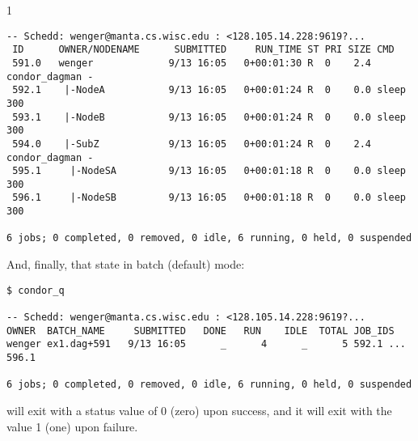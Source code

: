 \begin{ManPage}{\label{man-condor-q}}{1}
\begin{verbatim}
-- Schedd: wenger@manta.cs.wisc.edu : <128.105.14.228:9619?...
 ID      OWNER/NODENAME      SUBMITTED     RUN_TIME ST PRI SIZE CMD
 591.0   wenger             9/13 16:05   0+00:01:30 R  0    2.4 condor_dagman -
 592.1    |-NodeA           9/13 16:05   0+00:01:24 R  0    0.0 sleep 300
 593.1    |-NodeB           9/13 16:05   0+00:01:24 R  0    0.0 sleep 300
 594.0    |-SubZ            9/13 16:05   0+00:01:24 R  0    2.4 condor_dagman -
 595.1     |-NodeSA         9/13 16:05   0+00:01:18 R  0    0.0 sleep 300
 596.1     |-NodeSB         9/13 16:05   0+00:01:18 R  0    0.0 sleep 300

6 jobs; 0 completed, 0 removed, 0 idle, 6 running, 0 held, 0 suspended
\end{verbatim}
\normalsize

And, finally, that state in batch (default) mode:

\footnotesize
\begin{verbatim}
$ condor_q 

-- Schedd: wenger@manta.cs.wisc.edu : <128.105.14.228:9619?...
OWNER  BATCH_NAME     SUBMITTED   DONE   RUN    IDLE  TOTAL JOB_IDS
wenger ex1.dag+591   9/13 16:05      _      4      _      5 592.1 ... 596.1

6 jobs; 0 completed, 0 removed, 0 idle, 6 running, 0 held, 0 suspended
\end{verbatim}
\normalsize

\ExitStatus

 will exit with a status value of 0 (zero) upon success,
and it will exit with the value 1 (one) upon failure.

\end{ManPage}
